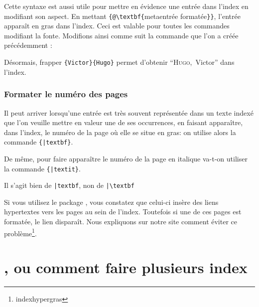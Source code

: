 \begin{bashcode}
\begin{quotation}
\begin{tabbing}
\end{tabbing}
\end{quotation}

Cette syntaxe est aussi utile pour mettre en évidence une entrée dans l'index en modifiant son aspect. En mettant \verb|{|\verb|@\textbf{|meta{entrée formatée}\verb|}}|, l'entrée apparaît en gras dans l'index. Ceci est valable pour toutes les commandes modifiant la fonte. Modifions ainsi comme suit la commande  que l'on a créée précédemment :

\begin{latexcode}
\newcommand\auteur[2]{#1~\textsc{#2}\index{#2 #1@\textsc{#2}, #1}\xspace}
\end{latexcode}

Désormais, frapper \verb|{Victor}{Hugo}| permet d'obtenir \enquote{\textsc{Hugo},~Victor} dans l'index.
 
 

\subsubsection{Formater le numéro des pages}

Il peut arriver lorsqu'une entrée est très souvent représentée dans un texte indexé que l'on veuille mettre en valeur une de ses occurrences, en faisant apparaître, dans l'index, le numéro de la page où elle se situe en gras: on utilise alors la commande \verb|{|\verb+|textbf}+. 

De même, pour faire apparaître le numéro de la page en italique va-t-on utiliser la commande \verb|{|\verb+|textit}+.

\begin{attention}
Il s'agit bien de \verb+|textbf+, non de \verb+|\textbf+
\end{attention}



\begin{plusloins}
Si vous utilisez le package , vous constatez que celui-ci insère des liens hypertextes vers les pages au sein de l'index. Toutefois si une de ces pages est formatée, le lien disparaît. Nous expliquons sur notre site comment éviter ce problème\footnote{indexhypergras}.
\end{plusloins}



\section{, ou comment faire plusieurs index} \label{splitindex}



\end{bashcode}
